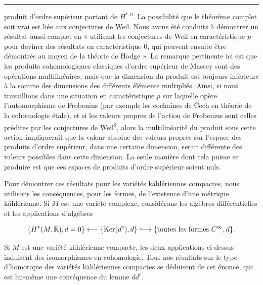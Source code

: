 \documentclass[
  french,
  a3paper,
  a3paper]{extarticle}
\begin{document}
\clearpage



\par

\vspace{0.7mm}\hrule\vspace{1.6mm}

\fontsize{9}{11}\selectfont

produit d'ordre supérieur partant de \(H^{*,0}\). La possibilité que le
théorème complet soit vrai est liée aux conjectures de Weil. Nous avons
été conduits à démontrer un résultat aussi complet en « utilisant les
conjectures de Weil en caractéristique \(p\) pour deviner des résultats
en caractéristique \(0\), qui peuvent ensuite être démontrés au moyen de
la théorie de Hodge ». La remarque pertinente ici est que les produits
cohomologiques classiques d'ordre supérieur de Massey sont des
opérations multilinéaires, mais que la dimension du produit est toujours
inférieure à la somme des dimensions des différents éléments multipliés.
Ainsi, si nous travaillions dans une situation en caractéristique \(p\)
sur laquelle opère l'automorphisme de Frobenius (par exemple les
cochaînes de Čech en théorie de la cohomologie étale), et si les valeurs
propres de l'action de Frobenius sont celles prédites par les
conjectures de Weil\textsuperscript{2}, alors la multilinéarité du
produit sous cette action impliquerait que la valeur absolue des valeurs
propres sur l'espace des produits d'ordre supérieur, dans une certaine
dimension, serait différente des valeurs possibles dans cette dimension.
La seule manière dont cela puisse se produire est que ces espaces de
produits d'ordre supérieur soient nuls.

Pour démontrer ces résultats pour les variétés kählériennes compactes,
nous utilisons les conséquences, pour les formes, de l'existence d'une
métrique kählérienne. Si \(M\) est une variété complexe, considérons les
algèbres différentielles et les applications d'algèbres

\[
\{H^*(M,\mathbb R),d=0\}\longleftarrow\{\operatorname{Ker}(d^c),d\}\lhook\joinrel\longrightarrow\{\text{toutes les formes }C^\infty,d\}.
\]

Si \(M\) est une variété kählérienne compacte, les deux applications
ci-dessus induisent des isomorphismes en cohomologie. Tous nos résultats
sur le type d'homotopie des variétés kählériennes compactes se déduisent
de cet énoncé, qui est lui-même une conséquence du lemme \(dd^c\).
\end{document}
